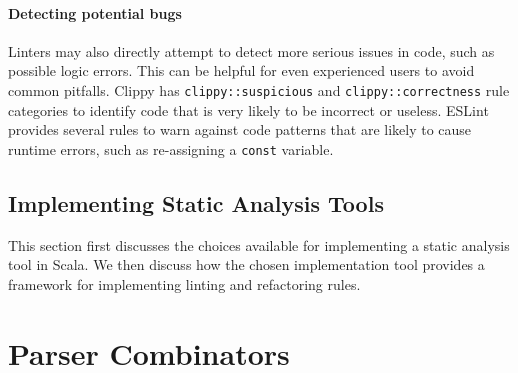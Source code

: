 \subsubsection{Detecting potential bugs}
Linters may also directly attempt to detect more serious issues in code, such as possible logic errors.
This can be helpful for even experienced users to avoid common pitfalls.
Clippy has \texttt{clippy::suspicious} and \texttt{clippy::correctness} rule categories to identify code that is very likely to be incorrect or useless.
ESLint provides several rules to warn against code patterns that are likely to cause runtime errors, such as re-assigning a \texttt{const} variable.

\section{Implementing Static Analysis Tools}
This section first discusses the choices available for implementing a static analysis tool in Scala.
We then discuss how the chosen implementation tool provides a framework for implementing linting and refactoring rules.


\chapter{Parser Combinators}
